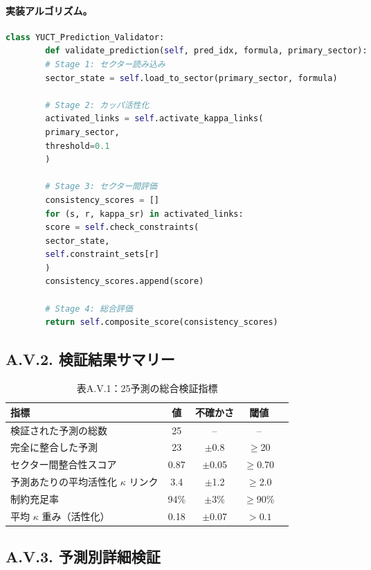 \documentclass[13pt,a4paper]{ltjsarticle}
\begin{document}
	\paragraph{実装アルゴリズム。}
	\begin{lstlisting}[language=Python]
		class YUCT_Prediction_Validator:
		def validate_prediction(self, pred_idx, formula, primary_sector):
		# Stage 1: セクター読み込み
		sector_state = self.load_to_sector(primary_sector, formula)
		
		# Stage 2: カッパ活性化
		activated_links = self.activate_kappa_links(
		primary_sector, 
		threshold=0.1
		)
		
		# Stage 3: セクター間評価
		consistency_scores = []
		for (s, r, kappa_sr) in activated_links:
		score = self.check_constraints(
		sector_state, 
		self.constraint_sets[r]
		)
		consistency_scores.append(score)
		
		# Stage 4: 総合評価
		return self.composite_score(consistency_scores)
	\end{lstlisting}
	
	\subsection*{A.V.2. 検証結果サマリー}
	
	\begin{table}[H]
		\centering
		\small
		\caption{表A.V.1：25予測の総合検証指標}
		\begin{tabular}{p{}cccc}
			\toprule
			\textbf{指標} & \textbf{値} & \textbf{不確かさ} & \textbf{閾値} \\
			\midrule
			検証された予測の総数 & 25 & -- & -- \\
			完全に整合した予測 & 23 & $\pm$0.8 & $\geq$20 \\
			セクター間整合性スコア & 0.87 & $\pm$0.05 & $\geq$0.70 \\
			予測あたりの平均活性化 $\kappa$ リンク & 3.4 & $\pm$1.2 & $\geq$2.0 \\
			制約充足率 & 94\% & $\pm$3\% & $\geq$90\% \\
			平均 $\kappa$ 重み（活性化） & 0.18 & $\pm$0.07 & $>0.1$ \\
			\bottomrule
		\end{tabular}
		\label{tab:validation-summary}
	\end{table}
	
	\subsection*{A.V.3. 予測別詳細検証}
	
\end{document}

